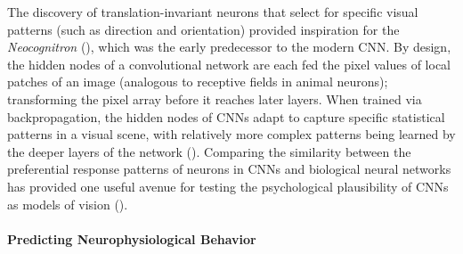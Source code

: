 \documentclass[12pt]{article}
\let\oldcite=\cite
\renewcommand{\cite}[1]{\textcolor[rgb]{0, .121, .388}{\oldcite{#1}}}
\begin{document}
The discovery of translation-invariant neurons that select for specific visual patterns (such as direction and orientation) provided inspiration for the \emph{Neocognitron} (\cite{fukushima1983neocognitron}), which was the early predecessor to the modern CNN. By design, the hidden nodes of a convolutional network are each fed the pixel values of local patches of an image (analogous to receptive fields in animal neurons); transforming the pixel array before it reaches later layers. When trained via backpropagation, the hidden nodes of CNNs adapt to capture specific statistical patterns in a visual scene, with relatively more complex patterns being learned by the deeper layers of the network (\cite{lee2009convolutional}). Comparing the similarity between the preferential response patterns of neurons in CNNs and biological neural networks has provided one useful avenue for testing the psychological plausibility of CNNs as models of vision (\cite{yamins2016using}).


\paragraph{Predicting Neurophysiological Behavior}\mbox{} \\
\end{document}
